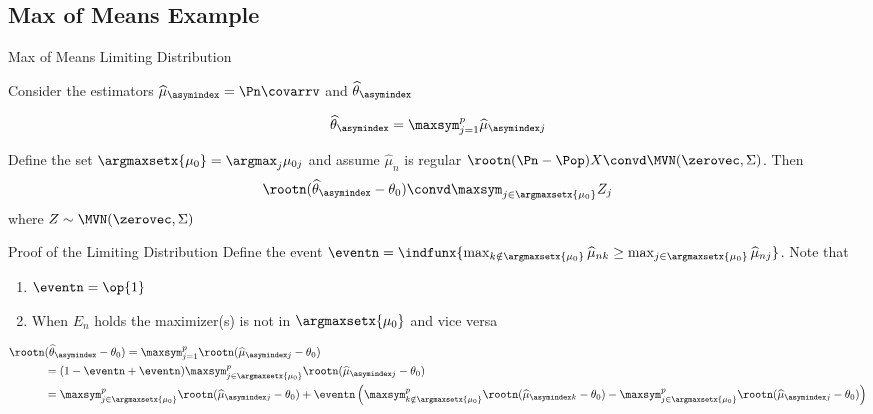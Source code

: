 \documentclass[aspectratio=169, professionalfonts]{beamer}
\begin{document}
\subsection{Max of Means Example}
\begin{frame}{Max of Means Limiting Distribution}

	Consider the estimators $\widehat{\mu}_{\asymindex} = \Pn \covarrv$  and $\widehat{\theta}_{\asymindex}$

	$$\widehat{\theta}_{\asymindex} = \maxsym_{j = 1}^p \widehat{\mu}_{\asymindex j}$$

	\begin{lemma}
		Define the set $\argmaxsetx{\mu_{0}} = \argmax_j \mu_{0j}$ and assume
		$\widehat{\mu}_n$ is regular $\rootn (\Pn - \Pop)X \convd \MVN(\zerovec, \Sigma)$. Then
		\begin{displaymath}
			\rootn (\widehat{\theta}_{\asymindex} - \theta_0) \convd \maxsym_{j \in \argmaxsetx{\mu_0}} Z_j
		\end{displaymath}
		where $Z \sim \MVN(\zerovec, \Sigma)$
	\end{lemma}

\end{frame}

\begin{frame}{Proof of the Limiting Distribution}
	Define the event $\eventn = \indfunx{\max_{k \notin \argmaxsetx{\mu_0}}
			\widehat{\mu}_{nk} \geq \max_{j \in\argmaxsetx{\mu_0}} \widehat{\mu}_{nj}}$. Note that
	\begin{enumerate}
		\item  $\eventn = \op{1}$
		\item When $E_n$ holds the maximizer(s) is not in $\argmaxsetx{\mu_0}$ and vice versa
	\end{enumerate}

	\begin{align*}
		\rootn & (\widehat{\theta}_{\asymindex} - \theta_0) =  \maxsym_{j = 1}^p
		\rootn(  \widehat{\mu}_{\asymindex j} -
		\theta_0)                                                                      \\
		       & = (1 - \eventn + \eventn) \maxsym_{j \in\argmaxsetx{\mu_0}}^p \rootn(
		\widehat{\mu}_{\asymindex j} - \theta_0)                                       \\
		       & =  \maxsym_{j \in\argmaxsetx{\mu_0}}^p \rootn(
		\widehat{\mu}_{\asymindex j} - \theta_0) + \eventn \left(\maxsym_{k \notin\argmaxsetx{\mu_0}}^p \rootn(
		\widehat{\mu}_{\asymindex k} - \theta_0)  - \maxsym_{j \in\argmaxsetx{\mu_0}}^p \rootn(
		\widehat{\mu}_{\asymindex j} - \theta_0)\right)
	\end{align*}
\end{frame}
\end{document}
